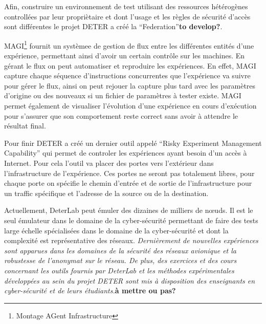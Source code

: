 Afin, construire un environnement de test utilisant des ressources hétérogènes
controllées par leur propriètaire et dont l'usage et les règles de sécurité
d'accès sont différentes le projet DETER a créé la
``Federation''\citep{DETER_faber2007deter}\textbf{to develop?}.

MAGI\footnote{Montage AGent Infrastructure} fournit un systèmee de gestion de
flux entre les différentes entités d'une expérience, permettant ainsi d'avoir un
certain contrôle sur les machines. En gérant le flux on peut automatiser et
reproduire les expériences. En effet, MAGI capture chaque séquence
d'instructions concurrentes que l'expérience va suivre pour gérer le flux, ainsi
on peut rejouer la capture plus tard avec les paramètres d'origine ou des
nouveaux si un fichier de paramètres à tester existe. MAGI permet également de
visualiser l'évolution d'une expérience en cours d'exécution pour s'assurer que
son comportement reste correct sans avoir à attendre le résultat final.

Pour finir DETER a créé un dernier outil appelé ``Risky Experiment Management
Capability'' qui permet de controler les expériences ayant besoin d'un accès à
Internet. Pour cela l'outil va placer des portes vers l'extérieur dans
l'infrastructure de l'expérience. Ces portes ne seront pas totalement libres,
pour chaque porte on spécifie le chemin d'entrée et de sortie de
l'infrastructure pour un traffic spécifique et l'adresse de la source ou de la
destination.

 Actuellement, DeterLab peut émuler des dizaines de milliers de n\oe uds. Il est
 le seul émulateur dans le domaine de la cyber-sécurité permettant de faire des
 tests large échelle spécialisées dans le domaine de la cyber-sécurité et dont
 la complexité est représentative des réseaux. \textit{Dernièrement de nouvelles
 expériences sont apparues dans les domaines de la sécurité des réseaux
 avionique et la robustesse de l'anonymat sur le réseau. De plus, des exercices
 et des cours concernant les outils fournis par DeterLab et les méthodes
 expérimentales développées au sein du projet DETER sont mis à disposition des
 enseignants en cyber-sécurité et de leurs étudiants.}\textbf{à mettre ou pas?}

